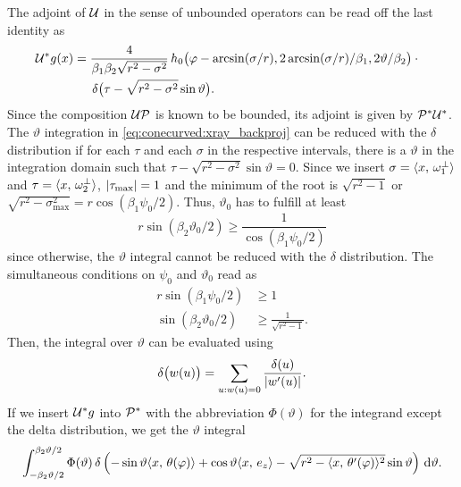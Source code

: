 \documentclass{amsart}
\renewcommand*{\phi}{\varphi}
\begin{document}
%
The adjoint of ${\mathcal{U}}$ in the sense of unbounded operators can be read off the last identity as
%
\begin{align}
 \label{eq:conecurved:coord_op_adjoint}
 \DUALOPU g(x) 
 &= \frac{4}{\beta_1\beta_2\sqrt{r^2 - \sigma^2}}\,
 h_0\big( \phi - \arcsin(\sigma/r), 2\arcsin(\sigma/r)/\beta_1, 2\vartheta/\beta_2 \big) \cdot \phantom{x} \\
 &\hspace{15pt}\delta\big(\tau - \sqrt{r^2 - \sigma^2} \sin\vartheta \big) \notag.
\end{align} 
%
Since the composition ${\mathcal{U}} {\mathcal{P}}$ is known to 
be bounded, its adjoint is given by ${{\mathcal{P}}^*} {{\mathcal{U}}^*}$. The $\vartheta$ integration in \eqref{eq:conecurved:xray_backproj} can be reduced 
with the $\delta$ distribution if for each $\tau$ and each $\sigma$ in the respective intervals, there is a $\vartheta$ in the integration 
domain such that $\tau - \sqrt{r^2 - \sigma^2} \sin\vartheta = 0$. Since we insert $\sigma = \langle x,\,\omega_1^\perp\rangle$ and $\tau = 
\langle x,\,\omega_2^\perp\rangle$, $|\tau_{\text{max}}| = 1$ and the minimum of the root is $\sqrt{r^2 - 1}$ or 
$\sqrt{r^2 - \sigma_{\text{max}}^2} = r\cos(\beta_1\psi_0/2)$. Thus, $\vartheta_0$ has to fulfill at least
%
\begin{equation}
 r\sin(\beta_2\vartheta_0/2) \geq \frac{1}{\cos(\beta_1\psi_0/2)}
\end{equation}
%
%
since otherwise, the $\vartheta$ integral cannot be reduced with the $\delta$ distribution. 
The simultaneous conditions on $\psi_0$ and $\vartheta_0$ read as
%
%
\begin{align}
 r \sin(\beta_1\psi_0/2) &\geq 1 \\
 \sin(\beta_2\vartheta_0/2) &\geq \frac{1}{\sqrt{r^2 - 1}}.
\end{align}
%
Then, the integral over $\vartheta$ can be evaluated using
%
\begin{equation*}
 \delta\big(w(u)\big) = \sum_{u:w(u)=0} \frac{\delta(u)}{|w'(u)|}.
\end{equation*}
%
If we insert ${{\mathcal{U}}^*} g$ into ${{\mathcal{P}}^*}$ with the abbreviation $\Phi(\vartheta)$ for the integrand except the delta distribution, we get 
the $\vartheta$ integral
%
\begin{equation}
 \label{eq:conecurved:theta_integral_delta}
 \int_{-\beta_2\vartheta/2}^{\beta_2\vartheta/2} \Phi(\vartheta)\, 
 \delta\left( -\sin\vartheta \INNER{x}{\theta(\phi)} + \cos\vartheta \INNER{x}{e_z} - \sqrt{r^2 - \INNER{x}{\theta'(\phi)}^2} \sin\vartheta 
 \right)\, \D\vartheta.
\end{equation}
\end{document}
